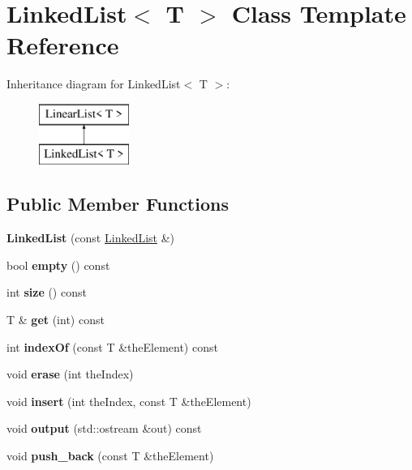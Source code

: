 \hypertarget{classLinkedList}{}\section{Linked\+List$<$ T $>$ Class Template Reference}
\label{classLinkedList}
Inheritance diagram for Linked\+List$<$ T $>$\+:\begin{figure}[H]
\begin{center}
\leavevmode
\includegraphics[height=2.000000cm]{classLinkedList}
\end{center}
\end{figure}
\subsection*{Public Member Functions}
\begin{DoxyCompactItemize}
\item 
\mbox{\label{classLinkedList_af82224d7ec3e1a5779e9385bf058b6b5}} 
{\bfseries Linked\+List} (const \hyperlink{classLinkedList}{Linked\+List} \&)
\item 
\mbox{\label{classLinkedList_a91a89733b527e2d8eaa08849848be4a5}} 
bool {\bfseries empty} () const
\item 
\mbox{\label{classLinkedList_aeaa08d2b3584e62dceb5de5e7649fb89}} 
int {\bfseries size} () const
\item 
\mbox{\label{classLinkedList_a4f0db14e4c550538bba503e90f6db8e8}} 
T \& {\bfseries get} (int) const
\item 
\mbox{\label{classLinkedList_a534af13eb6936dfd50ca9bafcc9fab67}} 
int {\bfseries index\+Of} (const T \&the\+Element) const
\item 
\mbox{\label{classLinkedList_abe5bcd829cc8e4f0e9630aa47686aecf}} 
void {\bfseries erase} (int the\+Index)
\item 
\mbox{\label{classLinkedList_aeebe589f6d8eca4029bde62d71d1a2b8}} 
void {\bfseries insert} (int the\+Index, const T \&the\+Element)
\item 
\mbox{\label{classLinkedList_a894956b84b369be19134c0bbc72d25bb}} 
void {\bfseries output} (std\+::ostream \&out) const
\item 
\mbox{\label{classLinkedList_a4eb411b244df427dbb5f7ed5374ee2da}} 
void {\bfseries push\+\_\+back} (const T \&the\+Element)
\end{DoxyCompactItemize}
